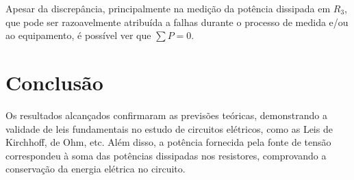 \documentclass[a4 paper]{article}
\newcommand{\parag}{\hspace{30pt}}
\begin{document}
\parag Apesar da discrepância, principalmente na medição da potência dissipada em $R_3$, que pode ser razoavelmente atribuída a falhas durante o processo de medida e/ou ao equipamento, é possível ver que $\sum P=0$.

\newpage
\section{Conclusão}
\parag Os resultados alcançados confirmaram as previsões teóricas, demonstrando a validade de leis fundamentais no estudo de circuitos elétricos, como as Leis de Kirchhoff, de Ohm, etc.  Além disso, a potência fornecida pela fonte de tensão correspondeu à soma das potências dissipadas nos resistores, comprovando a conservação da energia elétrica no circuito. 
\end{document}
